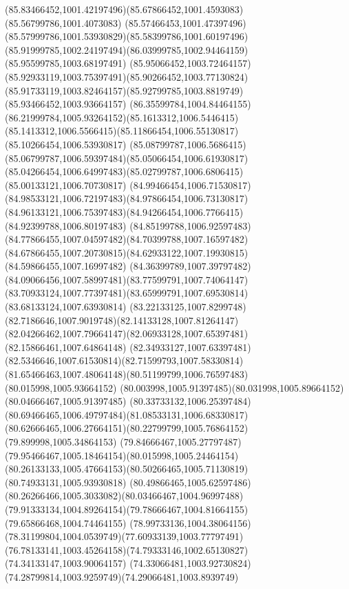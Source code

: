 {{		\curveto(85.83466452,1001.42197496)(85.67866452,1001.4593083)(85.56799786,1001.4073083)
		\curveto(85.57466453,1001.47397496)(85.57999786,1001.53930829)(85.58399786,1001.60197496)
		\curveto(85.91999785,1002.24197494)(86.03999785,1002.94464159)(85.95599785,1003.68197491)
		\curveto(85.95066452,1003.72464157)(85.92933119,1003.75397491)(85.90266452,1003.77130824)
		\curveto(85.91733119,1003.82464157)(85.92799785,1003.8819749)(85.93466452,1003.93664157)
		\curveto(86.35599784,1004.84464155)(86.21999784,1005.93264152)(85.1613312,1006.5446415)
		\curveto(85.1413312,1006.5566415)(85.11866454,1006.55130817)(85.10266454,1006.53930817)
		\curveto(85.08799787,1006.5686415)(85.06799787,1006.59397484)(85.05066454,1006.61930817)
		\curveto(85.04266454,1006.64997483)(85.02799787,1006.6806415)(85.00133121,1006.70730817)
		\curveto(84.99466454,1006.71530817)(84.98533121,1006.72197483)(84.97866454,1006.73130817)
		\curveto(84.96133121,1006.75397483)(84.94266454,1006.7766415)(84.92399788,1006.80197483)
		\curveto(84.85199788,1006.92597483)(84.77866455,1007.04597482)(84.70399788,1007.16597482)
		\curveto(84.67866455,1007.20730815)(84.62933122,1007.19930815)(84.59866455,1007.16997482)
		\curveto(84.36399789,1007.39797482)(84.09066456,1007.58997481)(83.77599791,1007.74064147)
		\curveto(83.70933124,1007.77397481)(83.65999791,1007.69530814)(83.68133124,1007.63930814)
		\curveto(83.22133125,1007.8299748)(82.7186646,1007.9019748)(82.14133128,1007.81264147)
		\curveto(82.04266462,1007.79664147)(82.06933128,1007.65397481)(82.15866461,1007.64864148)
		\curveto(82.34933127,1007.63397481)(82.5346646,1007.61530814)(82.71599793,1007.58330814)
		\curveto(81.65466463,1007.48064148)(80.51199799,1006.76597483)(80.015998,1005.93664152)
		\curveto(80.003998,1005.91397485)(80.031998,1005.89664152)(80.04666467,1005.91397485)
		\curveto(80.33733132,1006.25397484)(80.69466465,1006.49797484)(81.08533131,1006.68330817)
		\curveto(80.62666465,1006.27664151)(80.22799799,1005.76864152)(79.899998,1005.34864153)
		\curveto(79.84666467,1005.27797487)(79.95466467,1005.18464154)(80.015998,1005.24464154)
		\curveto(80.26133133,1005.47664153)(80.50266465,1005.71130819)(80.74933131,1005.93930818)
		\curveto(80.49866465,1005.62597486)(80.26266466,1005.3033082)(80.03466467,1004.96997488)
		\curveto(79.91333134,1004.89264154)(79.78666467,1004.81664155)(79.65866468,1004.74464155)
		\curveto(78.99733136,1004.38064156)(78.31199804,1004.0539749)(77.60933139,1003.77797491)
		\curveto(76.78133141,1003.45264158)(74.79333146,1002.65130827)(74.34133147,1003.90064157)
		\curveto(74.33066481,1003.92730824)(74.28799814,1003.9259749)(74.29066481,1003.8939749)
}}
